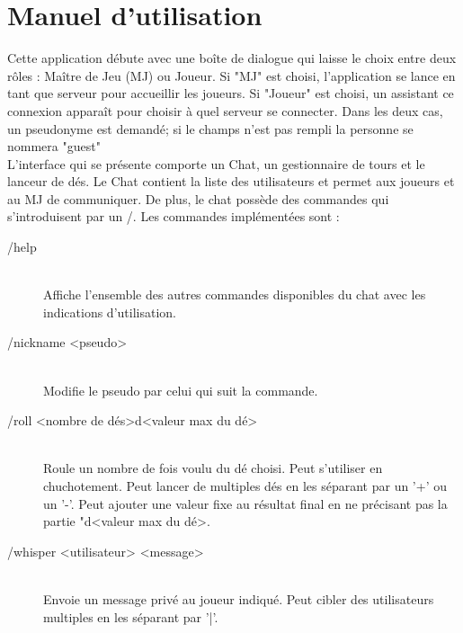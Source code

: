 \section{Manuel d'utilisation}

Cette application débute avec une boîte de dialogue qui laisse le choix entre deux rôles : Maître de Jeu (MJ) ou Joueur. Si "MJ" est choisi, l'application se lance en tant que serveur pour accueillir les joueurs. Si "Joueur" est choisi, un assistant ce connexion apparaît pour choisir à quel serveur se connecter. Dans les deux cas, un pseudonyme est demandé; si le champs n'est pas rempli la personne se nommera "guest" \\

L'interface qui se présente comporte un Chat, un gestionnaire de tours et le lanceur de dés. Le Chat contient la liste des utilisateurs et permet aux joueurs et au MJ de communiquer. De plus, le chat possède des commandes qui s'introduisent par un /. Les commandes implémentées sont :

\begin{description}
	\item[/help] \hfill \\
		Affiche l'ensemble des autres commandes disponibles du chat avec les indications d'utilisation.
	\item[/nickname <pseudo>] \hfill \\
		Modifie le pseudo par celui qui suit la commande.
	\item[/roll <nombre de dés>d<valeur max du dé>] \hfill \\
		Roule un nombre de fois voulu du dé choisi. Peut s'utiliser en chuchotement. Peut lancer de multiples dés en les séparant par un '+' ou un '-'. Peut ajouter une valeur fixe au résultat final en ne précisant pas la partie "d<valeur max du dé>.
	\item[/whisper <utilisateur> <message>] \hfill \\
		Envoie un message privé au joueur indiqué. Peut cibler des utilisateurs multiples en les séparant par '|'.
\end{description}

